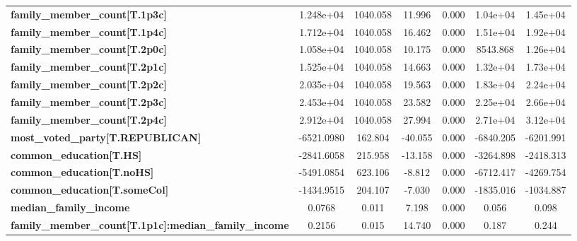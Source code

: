 \documentclass{report}
\begin{document}
\begin{center}
\begin{tabular}{lcccccc}
\textbf{family\_member\_count[T.1p3c]}                        &    1.248e+04  &     1040.058     &    11.996  &         0.000        &     1.04e+04    &     1.45e+04     \\
\textbf{family\_member\_count[T.1p4c]}                        &    1.712e+04  &     1040.058     &    16.462  &         0.000        &     1.51e+04    &     1.92e+04     \\
\textbf{family\_member\_count[T.2p0c]}                        &    1.058e+04  &     1040.058     &    10.175  &         0.000        &     8543.868    &     1.26e+04     \\
\textbf{family\_member\_count[T.2p1c]}                        &    1.525e+04  &     1040.058     &    14.663  &         0.000        &     1.32e+04    &     1.73e+04     \\
\textbf{family\_member\_count[T.2p2c]}                        &    2.035e+04  &     1040.058     &    19.563  &         0.000        &     1.83e+04    &     2.24e+04     \\
\textbf{family\_member\_count[T.2p3c]}                        &    2.453e+04  &     1040.058     &    23.582  &         0.000        &     2.25e+04    &     2.66e+04     \\
\textbf{family\_member\_count[T.2p4c]}                        &    2.912e+04  &     1040.058     &    27.994  &         0.000        &     2.71e+04    &     3.12e+04     \\
\textbf{most\_voted\_party[T.REPUBLICAN]}                     &   -6521.0980  &      162.804     &   -40.055  &         0.000        &    -6840.205    &    -6201.991     \\
\textbf{common\_education[T.HS]}                              &   -2841.6058  &      215.958     &   -13.158  &         0.000        &    -3264.898    &    -2418.313     \\
\textbf{common\_education[T.noHS]}                            &   -5491.0854  &      623.106     &    -8.812  &         0.000        &    -6712.417    &    -4269.754     \\
\textbf{common\_education[T.someCol]}                         &   -1434.9515  &      204.107     &    -7.030  &         0.000        &    -1835.016    &    -1034.887     \\
\textbf{median\_family\_income}                               &       0.0768  &        0.011     &     7.198  &         0.000        &        0.056    &        0.098     \\
\textbf{family\_member\_count[T.1p1c]:median\_family\_income} &       0.2156  &        0.015     &    14.740  &         0.000        &        0.187    &        0.244     \\

\end{tabular}
\end{center}
\end{document}
